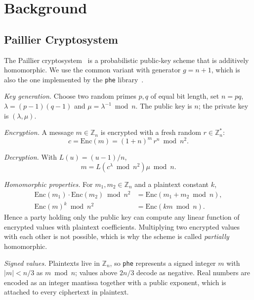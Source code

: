 \section{Background}\label{sec:background}

\subsection{Paillier Cryptosystem}

The Paillier cryptosystem~\cite{paillier1999} is a probabilistic public-key scheme that is additively homomorphic.
We use the common variant with generator $g = n + 1$, which is also the one implemented by the \texttt{phe} library~\cite{phe}.

\textit{Key generation.}
Choose two random primes $p, q$ of equal bit length, set $n = pq$, $\lambda = (p-1)(q-1)$ and $\mu = \lambda^{-1} \bmod n$.
The public key is $n$; the private key is $(\lambda, \mu)$.

\textit{Encryption.}
A message $m \in \mathbb{Z}_n$ is encrypted with a fresh random $r \in \mathbb{Z}_n^*$:
\begin{equation}
  c = \mathrm{Enc}(m) = (1 + n)^m \, r^n \bmod n^2 .
\end{equation}

\textit{Decryption.}
With $L(u) = (u - 1) / n$,
\begin{equation}
  m = L\!\left(c^{\lambda} \bmod n^2\right) \mu \bmod n .
\end{equation}

\textit{Homomorphic properties.}
For $m_1, m_2 \in \mathbb{Z}_n$ and a plaintext constant $k$,
\begin{align}
  \mathrm{Enc}(m_1) \cdot \mathrm{Enc}(m_2) \bmod n^2 &= \mathrm{Enc}(m_1 + m_2 \bmod n), \label{eq:hom-add}\\
  \mathrm{Enc}(m)^{k} \bmod n^2 &= \mathrm{Enc}(k m \bmod n). \label{eq:hom-mul}
\end{align}
Hence a party holding only the public key can compute any linear function of encrypted values with plaintext coefficients.
Multiplying two encrypted values with each other is not possible, which is why the scheme is called \emph{partially} homomorphic.

\textit{Signed values.}
Plaintexts live in $\mathbb{Z}_n$, so \texttt{phe} represents a signed integer $m$ with $|m| < n/3$ as $m \bmod n$; values above $2n/3$ decode as negative.
Real numbers are encoded as an integer mantissa together with a public exponent, which is attached to every ciphertext in plaintext.


